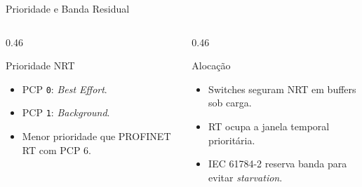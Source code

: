 \documentclass[10pt, aspectratio=169]{beamer}
\begin{document}
\begin{frame}{Prioridade e Banda Residual}
    \small
    \begin{columns}[T,totalwidth=\textwidth]
        \begin{column}{0.46\textwidth}
            \begin{block}{Prioridade NRT}
                \begin{itemize}
                    \item PCP \texttt{0}: \textit{Best Effort}.
                    \item PCP \texttt{1}: \textit{Background}.
                    \item Menor prioridade que PROFINET RT com PCP 6.
                \end{itemize}
            \end{block}
        \end{column}
        \begin{column}{0.46\textwidth}
            \begin{block}{Aloca\c{c}\~ao}
                \begin{itemize}
                    \item Switches seguram NRT em buffers sob carga.
                    \item RT ocupa a janela temporal priorit\'aria.
                    \item IEC 61784-2 reserva banda para evitar \textit{starvation}.
                \end{itemize}
            \end{block}
        \end{column}
    \end{columns}
\end{frame}
\end{document}
